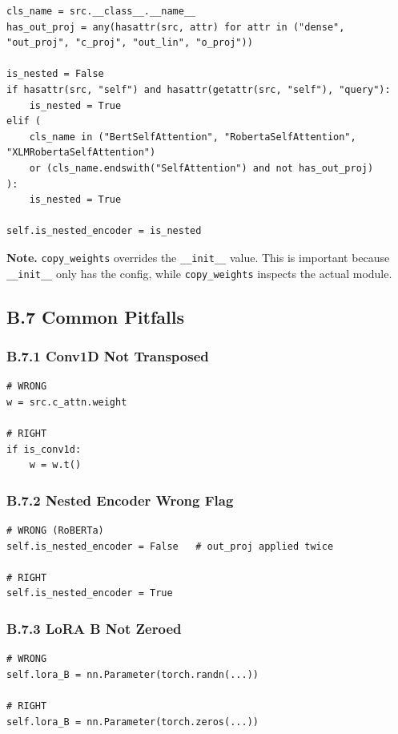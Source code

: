 \begin{lstlisting}
cls_name = src.__class__.__name__
has_out_proj = any(hasattr(src, attr) for attr in ("dense", "out_proj", "c_proj", "out_lin", "o_proj"))

is_nested = False
if hasattr(src, "self") and hasattr(getattr(src, "self"), "query"):
    is_nested = True
elif (
    cls_name in ("BertSelfAttention", "RobertaSelfAttention", "XLMRobertaSelfAttention")
    or (cls_name.endswith("SelfAttention") and not has_out_proj)
):
    is_nested = True

self.is_nested_encoder = is_nested
\end{lstlisting}

\textbf{Note.} \texttt{copy\_weights} overrides the \texttt{\_\_init\_\_} value. This is important 
because \texttt{\_\_init\_\_} only has the config, while \texttt{copy\_weights} inspects the 
actual module.

\subsection{B.7 Common Pitfalls}

\subsubsection{B.7.1 Conv1D Not Transposed}

\begin{lstlisting}
# WRONG
w = src.c_attn.weight

# RIGHT
if is_conv1d:
    w = w.t()
\end{lstlisting}

\subsubsection{B.7.2 Nested Encoder Wrong Flag}

\begin{lstlisting}
# WRONG (RoBERTa)
self.is_nested_encoder = False   # out_proj applied twice

# RIGHT
self.is_nested_encoder = True
\end{lstlisting}

\subsubsection{B.7.3 LoRA B Not Zeroed}

\begin{lstlisting}
# WRONG
self.lora_B = nn.Parameter(torch.randn(...))

# RIGHT
self.lora_B = nn.Parameter(torch.zeros(...))
\end{lstlisting}

